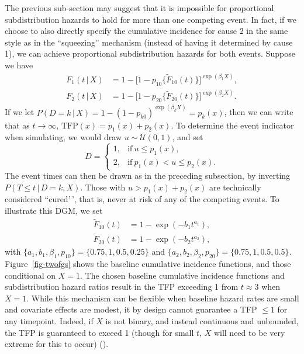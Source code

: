 \documentclass[
  letterpaper,
  DIV=11,
  numbers=noendperiod]{scrreprt}
\newcommand{\given}{\,|\,}
\begin{document}
The previous sub-section may suggest that it is impossible for
proportional subdistribution hazards to hold for more than one competing
event. In fact, if we choose to also directly specify the cumulative
incidence for cause 2 in the same style as in the ``squeezing''
mechanism (instead of having it determined by cause 1), we can achieve
proportional subdistribution hazards for both events. Suppose we have
\begin{align*}
    F_1(t \given X) &= 1 - \big[1 - p_{10}\{\tilde{F}_{10}(t)\} \big]^{\exp(\beta_1X)}, \\
    F_2(t \given X) &= 1 - \big[1 - p_{20}\{\tilde{F}_{20}(t)\} \big]^{\exp(\beta_2X)}.
\end{align*} If we let
\(P(D = k \given X) = 1 - (1 - p_{k0})^{\exp(\beta_{k}X)} = p_k(x)\),
then we can write that as \(t \to \infty\),
\(\text{TFP}(x) = p_1(x) + p_2(x)\). To determine the event indicator
when simulating, we would draw \(u \sim \mathcal{U}(0,1)\), and set
\begin{equation*}
    D = 
    \begin{cases}
        1, & \text{if}\ u \leq p_1(x), \\
        2, & \text{if}\ p_1(x) < u \leq p_2(x). 
    \end{cases}
\end{equation*} The event times can then be drawn as in the preceding
subsection, by inverting \(P(T \leq t \given D=k, X)\). Those with
\(u > p_1(x) + p_2(x)\) are technically considered ``cured'\,', that is,
never at risk of any of the competing events. To illustrate this DGM, we
set \begin{align*}
    \tilde{F}_{10}(t) &= 1 - \exp(-b_1t^{a_1}), \\
    \tilde{F}_{20}(t) &= 1 - \exp(-b_2t^{a_2}),
\end{align*} with
\(\{a_1, b_1, \beta_1, p_{10}\} = \{0.75, 1, 0.5, 0.25\}\) and
\(\{a_2, b_2,\beta_{2}, p_{20}\} = \{0.75, 1, 0.5, 0.5\}\).
Figure~\ref{fig-twofgs} shows the baseline cumulative incidence
functions, and those conditional on \(X = 1\). The chosen baseline
cumulative incidence functions and subdistribution hazard ratios result
in the TFP exceeding 1 from \(t \approx 3\) when \(X = 1\). While this
mechanism can be flexible when baseline hazard rates are small and
covariate effects are modest, it by design cannot guarantee a TFP
\(\leq 1\) for any timepoint. Indeed, if \(X\) is not binary, and
instead continuous and unbounded, the TFP is guaranteed to exceed 1
(though for small \(t\), \(X\) will need to be very extreme for this to
occur) ().
\end{document}
